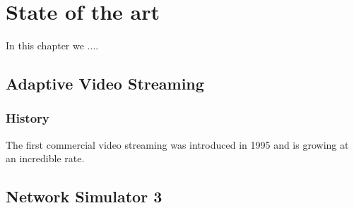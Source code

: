 \chapter{State of the art}
\label{chap:soa}

In this chapter we ....


\section{Adaptive Video Streaming}
\label{sec:abr}

\subsection{History}
\label{sec:abrhistory}

The first commercial video streaming was introduced in 1995 and is growing at an incredible
rate. 







\section{Network Simulator 3}
\label{sec:ns3}

